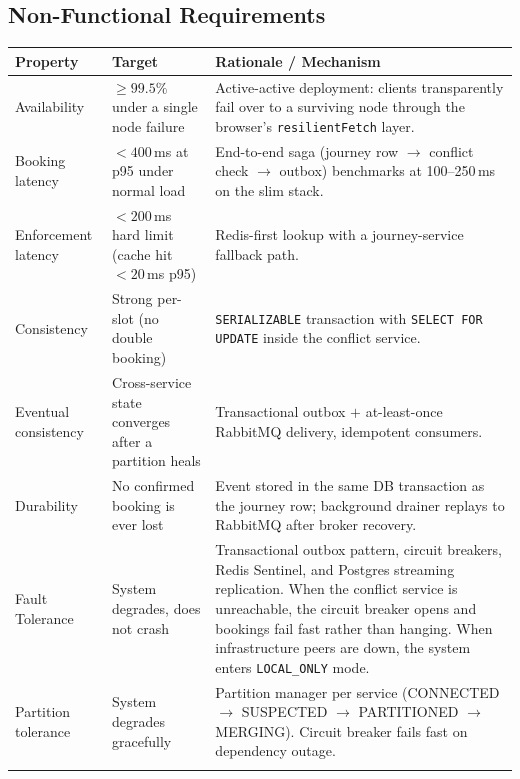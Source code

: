 \documentclass[12pt,a4paper]{article}
\begin{document}
\subsection{Non-Functional Requirements}
\label{sec:nfr}
 
\begin{table}[H]
\centering\small
\begin{tabularx}{\textwidth}{L{3.2cm} L{4.4cm} X}
  \toprule
  \textbf{Property} & \textbf{Target} & \textbf{Rationale / Mechanism} \\
  \midrule
  Availability & $\geq 99.5\%$ under a single node failure & Active-active
        deployment: clients transparently fail over to a surviving node
        through the browser's \texttt{resilientFetch} layer. \\\addlinespace[0.1cm]
  Booking latency & $<400\,$ms at p95 under normal load & End-to-end saga
        (journey row $\to$ conflict check $\to$ outbox) benchmarks at
        100--250\,ms on the slim stack. \\\addlinespace[0.1cm]
  Enforcement latency & $<200\,$ms hard limit (cache hit $<20\,$ms p95) &
        Redis-first lookup with a journey-service fallback path. \\\addlinespace[0.1cm]
  Consistency & Strong per-slot (no double booking) & \texttt{SERIALIZABLE}
        transaction with \texttt{SELECT FOR UPDATE} inside the conflict
        service. \\\addlinespace[0.1cm]
  Eventual consistency & Cross-service state converges after a partition
        heals & Transactional outbox $+$ at-least-once RabbitMQ delivery,
        idempotent consumers. \\\addlinespace[0.1cm]
  Durability & No confirmed booking is ever lost & Event stored in the same
        DB transaction as the journey row; background drainer replays to
        RabbitMQ after broker recovery. \\\addlinespace[0.1cm]
  Fault Tolerance & System degrades, does not crash & Transactional outbox pattern, circuit breakers, Redis Sentinel, and Postgres streaming replication. When the conflict service is unreachable, the circuit breaker opens and bookings fail fast rather than hanging. When infrastructure peers are down, the system enters \texttt{LOCAL\_ONLY} mode. \\\addlinespace[0.1cm]
  Partition tolerance & System degrades gracefully & Partition manager
        per service (CONNECTED $\to$ SUSPECTED $\to$ PARTITIONED $\to$
        MERGING). Circuit breaker fails fast on dependency outage. \\\addlinespace[0.1cm]

\end{tabularx}
\end{table}
\end{document}
